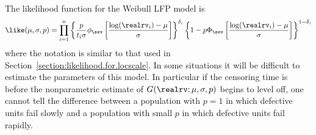 The likelihood function for the Weibull LFP model is
\begin{equation}
\like(\mu,\sigma,p)=  \prod_{i=1}^{n}
\left\{ \frac{p}{t_{i}\sigma} \phi_{\sev}
\left[\frac{ \log(\realrv_{i}) -\mu}{\sigma}
\right]
\right\}^{\delta_{i}}
 \left\{ 1-p \Phi_{\sev}\left[\frac{ \log(\realrv_{i}) -\mu}{\sigma}
\right] \right\}^{1-\delta_{i}}
\label{equation:lfp.likelihood}
\end{equation}
where the notation is similar to that used in
Section~\ref{section:likelihood.for.locscale}.  In some situations it
will be difficult to estimate the parameters of this model. In
particular if the censoring time is before the nonparametric estimate
of $G(\realrv;\mu,\sigma,p)$ begins to level off, one cannot tell the
difference between a population with $p=1$ in which defective units
fail slowly and a population with small $p$ in which defective units
fail rapidly.

